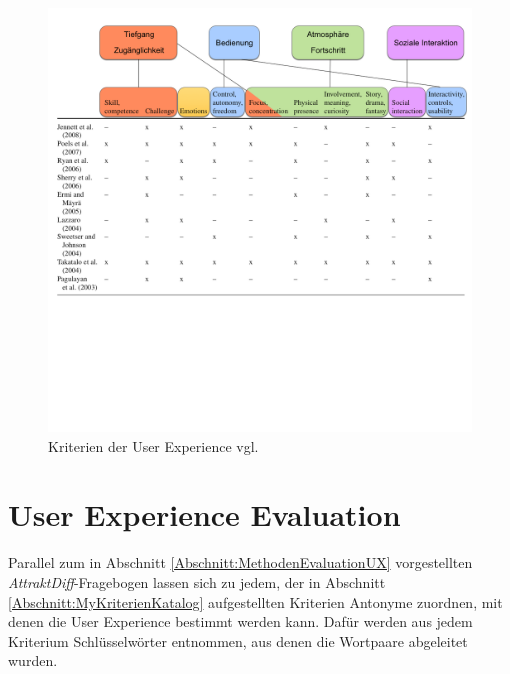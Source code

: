 \begin{figure}[H]
    \centering 
    \includegraphics[trim=5 90 3 10,clip,width=1\textwidth]{files/ux/uxInGamesColored}
    \caption{Kriterien der User Experience vgl. \cite[S. 29]{Bernhaupt:2010vi}}
    \label{pic:uxInGamesExtended}
\end{figure}



\pagebreak

\section{User Experience Evaluation}
\label{Abschnitt:AttUXEva}

Parallel zum in Abschnitt \ref{Abschnitt:MethodenEvaluationUX} vorgestellten \textit{AttraktDiff}-Fragebogen lassen sich zu jedem, der in Abschnitt \ref{Abschnitt:MyKriterienKatalog} aufgestellten Kriterien Antonyme zuordnen, mit denen die User Experience bestimmt werden kann. Dafür werden aus jedem Kriterium Schlüsselwörter entnommen, aus denen die Wortpaare abgeleitet wurden.

